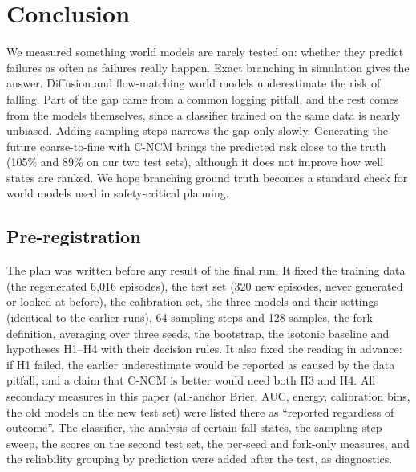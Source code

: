 \documentclass[conference]{IEEEtran}
\newcommand{\cncm}{C-NCM}
\begin{document}
\section{Conclusion}

We measured something world models are rarely tested on: whether they predict failures
as often as failures really happen. Exact branching in simulation gives the answer.
Diffusion and flow-matching world models underestimate the risk of falling. Part of the
gap came from a common logging pitfall, and the rest comes from the models themselves,
since a classifier trained on the same data is nearly unbiased. Adding sampling steps
narrows the gap only slowly. Generating the future coarse-to-fine with \cncm{} brings the
predicted risk close to the truth (105\% and 89\% on our two test sets), although it does
not improve how well states are ranked. We hope branching ground truth becomes a standard
check for world models used in safety-critical planning.




\appendix

\subsection{Pre-registration}
\label{app:prereg}
The plan was written before any result of the final run. It fixed the training data (the
regenerated 6,016 episodes), the test set (320 new episodes, never generated or looked at
before), the calibration set, the three models and their settings (identical to the
earlier runs), 64 sampling steps and 128 samples, the fork definition, averaging over
three seeds, the bootstrap, the isotonic baseline and hypotheses H1--H4 with their
decision rules. It also fixed the reading in advance: if H1 failed, the earlier
underestimate would be reported as caused by the data pitfall, and a claim that \cncm{} is
better would need both H3 and H4. All secondary measures in this paper (all-anchor Brier,
AUC, energy, calibration bins, the old models on the new test set) were listed there as
``reported regardless of outcome''. The classifier, the analysis of certain-fall states,
the sampling-step sweep, the scores on the second test set, the per-seed and fork-only
measures, and the reliability grouping by prediction were added after the test, as
diagnostics.
\end{document}
